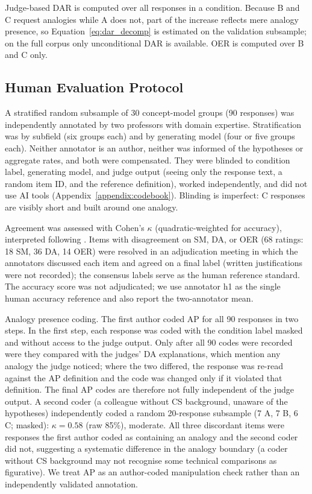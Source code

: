 \documentclass[journal,article,submit,pdftex,moreauthors]{Definitions/mdpi}
\begin{document}
Judge-based DAR is computed over all responses in a condition. Because B and C request analogies while A does not, part of the increase reflects mere analogy presence, so Equation~\ref{eq:dar_decomp} is estimated on the validation subsample; on the full corpus only unconditional DAR is available. OER is computed over B and C only.

\subsection{Human Evaluation Protocol}
\label{sec:human:eval}

A stratified random subsample of 30 concept-model groups (90 responses) was independently annotated by two professors with domain expertise. Stratification was by subfield (six groups each) and by generating model (four or five groups each). Neither annotator is an author, neither was informed of the hypotheses or aggregate rates, and both were compensated. They were blinded to condition label, generating model, and judge output (seeing only the response text, a random item ID, and the reference definition), worked independently, and did not use AI tools (Appendix~\ref{appendix:codebook}). Blinding is imperfect: C responses are visibly short and built around one analogy.

Agreement was assessed with Cohen's $\kappa$ \cite{cohen1960coefficient} (quadratic-weighted for accuracy), interpreted following \citet{landis1977measurement}. Items with disagreement on SM, DA, or OER (68 ratings: 18 SM, 36 DA, 14 OER) were resolved in an adjudication meeting in which the annotators discussed each item and agreed on a final label (written justifications were not recorded); the consensus labels serve as the human reference standard. The accuracy score was not adjudicated; we use annotator h1 as the single human accuracy reference and also report the two-annotator mean.

Analogy presence coding. The first author coded AP for all 90 responses in two steps. In the first step, each response was coded with the condition label masked and without access to the judge output. Only after all 90 codes were recorded were they compared with the judges' DA explanations, which mention any analogy the judge noticed; where the two differed, the response was re-read against the AP definition and the code was changed only if it violated that definition. The final AP codes are therefore not fully independent of the judge output. A second coder (a colleague without CS background, unaware of the hypotheses) independently coded a random 20-response subsample (7 A, 7 B, 6 C; masked): $\kappa = 0.58$ (raw 85\%), moderate. All three discordant items were responses the first author coded as containing an analogy and the second coder did not, suggesting a systematic difference in the analogy boundary (a coder without CS background may not recognise some technical comparisons as figurative). We treat AP as an author-coded manipulation check rather than an independently validated annotation.
\end{document}

